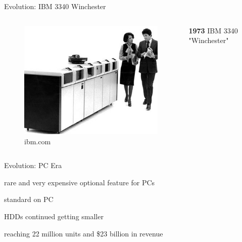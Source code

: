 \documentclass[12pt]{beamer}
\newlength{\wideitemsep}
\let\olditem\item
\renewcommand{\item}{\setlength{\itemsep}{\wideitemsep}\olditem}
\begin{document}
\begin{frame}[fragile]{Evolution: IBM 3340 Winchester}
	\begin{columns}[c]
	\begin{column}[c]{.5\textwidth}	
 		\begin{figure}[c]
	 		\centering
	 		\includegraphics[width=\linewidth]{img/ibm_3340.jpg}
	 			\caption{ibm.com}
 		\end{figure}
 	\end{column}
 	
	\begin{column}[c]{.5\textwidth}
		\textbf{1973} IBM 3340 "Winchester"
	\end{column}
	\end{columns}
\end{frame}

\begin{frame}[fragile]{Evolution: PC Era}
	\begin{description}
		\item[early 1980] rare and very expensive optional feature for PCs
		\item[late 1980] standard on PC
		\item[1983-1988] HDDs continued getting smaller
		\item[1989] reaching 22 million units and \$23 billion in revenue
	\end{description}
\end{frame}
\end{document}
